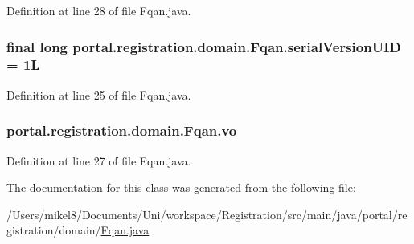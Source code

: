 Definition at line 28 of file Fqan.java.

\hypertarget{classportal_1_1registration_1_1domain_1_1Fqan_a0b9b4848dc758619b3bfca40e4f6edd5}{
\subsubsection[{serialVersionUID}]{\setlength{\rightskip}{0pt plus 5cm}final long {\bf portal.registration.domain.Fqan.serialVersionUID} = 1L}}
\label{classportal_1_1registration_1_1domain_1_1Fqan_a0b9b4848dc758619b3bfca40e4f6edd5}


Definition at line 25 of file Fqan.java.

\hypertarget{classportal_1_1registration_1_1domain_1_1Fqan_a8e4e4b03f04876190df45dc42f536a83}{
\subsubsection[{vo}]{ {\bf portal.registration.domain.Fqan.vo}}}
\label{classportal_1_1registration_1_1domain_1_1Fqan_a8e4e4b03f04876190df45dc42f536a83}


Definition at line 27 of file Fqan.java.



The documentation for this class was generated from the following file:\begin{DoxyCompactItemize}
\item 
/Users/mikel8/Documents/Uni/workspace/Registration/src/main/java/portal/registration/domain/\hyperlink{Fqan_8java}{Fqan.java}\end{DoxyCompactItemize}
